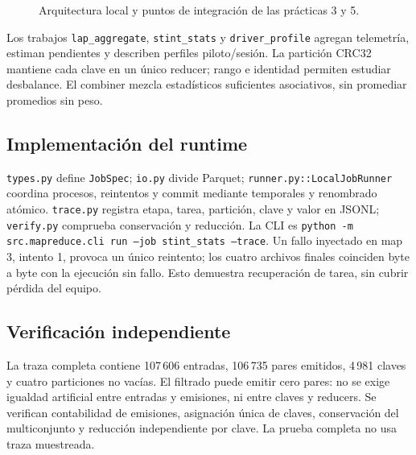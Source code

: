 \documentclass[conference]{IEEEtran}
\begin{document}
\begin{figure}[!htbp]\centering\scriptsize
{}
\caption{Arquitectura local y puntos de integración de las prácticas 3 y 5.}
\label{fig:phase9-architecture}\end{figure}

Los trabajos \texttt{lap\_aggregate}, \texttt{stint\_stats} y
\texttt{driver\_profile} agregan telemetría, estiman pendientes y describen
perfiles piloto/sesión. La partición CRC32 mantiene cada clave en un único
reducer; rango e identidad permiten estudiar desbalance. El combiner mezcla
estadísticos suficientes asociativos, sin promediar promedios sin peso.

\subsection{Implementación del runtime}
\texttt{types.py} define \texttt{JobSpec}; \texttt{io.py} divide Parquet;
\texttt{runner.py::LocalJobRunner} coordina procesos, reintentos y commit
mediante temporales y renombrado atómico. \texttt{trace.py} registra etapa,
tarea, partición, clave y valor en JSONL; \texttt{verify.py} comprueba
conservación y reducción. La CLI es
\texttt{python -m src.mapreduce.cli run --job stint\_stats --trace}.
Un fallo inyectado en map 3, intento 1, provoca un único reintento;
los cuatro archivos finales coinciden byte a byte con la ejecución sin
fallo. Esto demuestra recuperación de tarea, sin cubrir pérdida del equipo.

\subsection{Verificación independiente}
La traza completa contiene 107\,606 entradas, 106\,735 pares emitidos,
4\,981 claves y cuatro particiones no vacías. El filtrado puede emitir cero
pares: no se exige igualdad artificial entre entradas y emisiones, ni entre
claves y reducers. Se verifican contabilidad de emisiones, asignación única
de claves, conservación del multiconjunto y reducción independiente por clave.
La prueba completa no usa traza muestreada.
\end{document}
